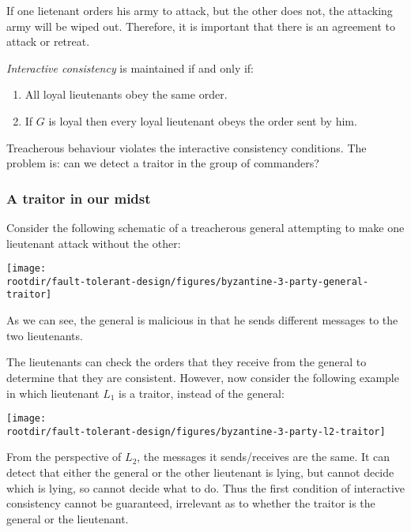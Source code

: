 If one lietenant orders his army to attack, but the other does not, the attacking army will be wiped out. Therefore, it is important that there is an agreement to attack or retreat.

\emph{Interactive consistency} is maintained if and only if:

\begin{enumerate}

\item All loyal lieutenants obey the same order.

\item If \(G\) is loyal then every loyal lieutenant obeys the order sent
by him.

\end{enumerate}

Treacherous behaviour violates the interactive consistency conditions. The problem is: can we detect a traitor in the group of commanders?

\subsubsection*{A traitor in our midst}

Consider the following schematic of a treacherous general attempting to make one lieutenant attack without the other:

\begin{center}
  \texttt{[image: \\rootdir/fault-tolerant-design/figures/byzantine-3-party-general-traitor]}
\end{center}

As we can see, the general is malicious in that he sends different messages to the two lieutenants.

The lieutenants can check the orders that they receive from the general to determine that they are consistent.  However, now consider the following example in which lieutenant \(L_1\) is a traitor, instead of the general:

\begin{center}
  \texttt{[image: \\rootdir/fault-tolerant-design/figures/byzantine-3-party-l2-traitor]}
\end{center}

From the perspective of \(L_2\), the messages it sends/receives are the same. It can detect that either the general or the other lieutenant is lying, but cannot decide which is lying, so cannot decide what to do. Thus the first condition of interactive consistency cannot be guaranteed, irrelevant as to whether the traitor is the general or the lieutenant.

